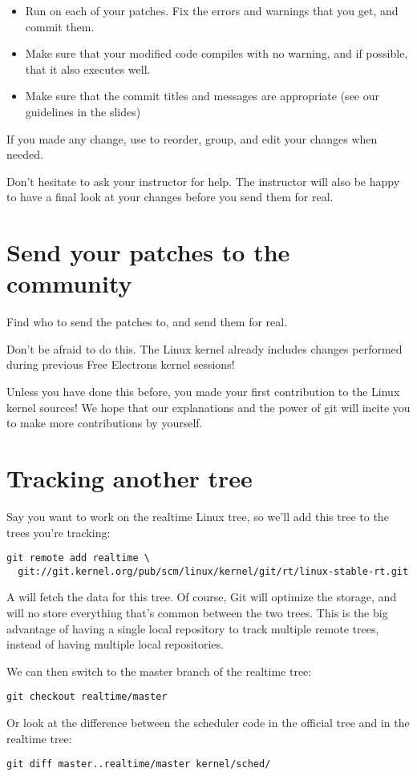 \begin{itemize}
\item Run  on each of your patches.
      Fix the errors and warnings that you get, and commit them.
\item Make sure that your modified code compiles with no warning,
      and if possible, that it also executes well.
\item Make sure that the commit titles and messages are appropriate
      (see our guidelines in the slides)
\end{itemize}

If you made any change, use  to
reorder, group, and edit your changes when needed. 

Don't hesitate to ask your instructor for help. The instructor will also 
be happy to have a final look at your changes before you send them for real.

\section{Send your patches to the community}

Find who to send the patches to, and send them for real.

Don't be afraid to do this. The Linux kernel already includes changes
performed during previous Free Electrons kernel sessions!

Unless you have done this before, you made your first contribution 
to the Linux kernel sources! We hope that our explanations and the power 
of git will incite you to make more contributions by yourself.

\section{Tracking another tree}

Say you want to work on the realtime Linux tree, so we'll add this
tree to the trees you're tracking:

\small
\begin{verbatim}
git remote add realtime \
  git://git.kernel.org/pub/scm/linux/kernel/git/rt/linux-stable-rt.git
\end{verbatim}
\normalsize

A  will fetch the data for this tree. Of course, Git
will optimize the storage, and will no store everything that's common
between the two trees. This is the big advantage of having a single
local repository to track multiple remote trees, instead of having
multiple local repositories.

We can then switch to the master branch of the realtime tree:

\begin{verbatim}
git checkout realtime/master
\end{verbatim}

Or look at the difference between the scheduler code in the official
tree and in the realtime tree:

\begin{verbatim}
git diff master..realtime/master kernel/sched/
\end{verbatim}

